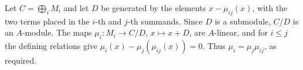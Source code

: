 Let $C=\bigoplus_iM_i$ and let $D$ be generated by the elements $x-\mu_{ij}(x)$, with the two terms placed in the $i$-th and $j$-th summands. Since $D$ is a submodule, $C/D$ is an $A$-module. The maps $\mu_i:M_i\to C/D$, $x\mapsto x+D$, are $A$-linear, and for $i\leq j$ the defining relations give $\mu_i(x)-\mu_j(\mu_{ij}(x))=0$. Thus $\mu_i=\mu_j\mu_{ij}$, as required.
